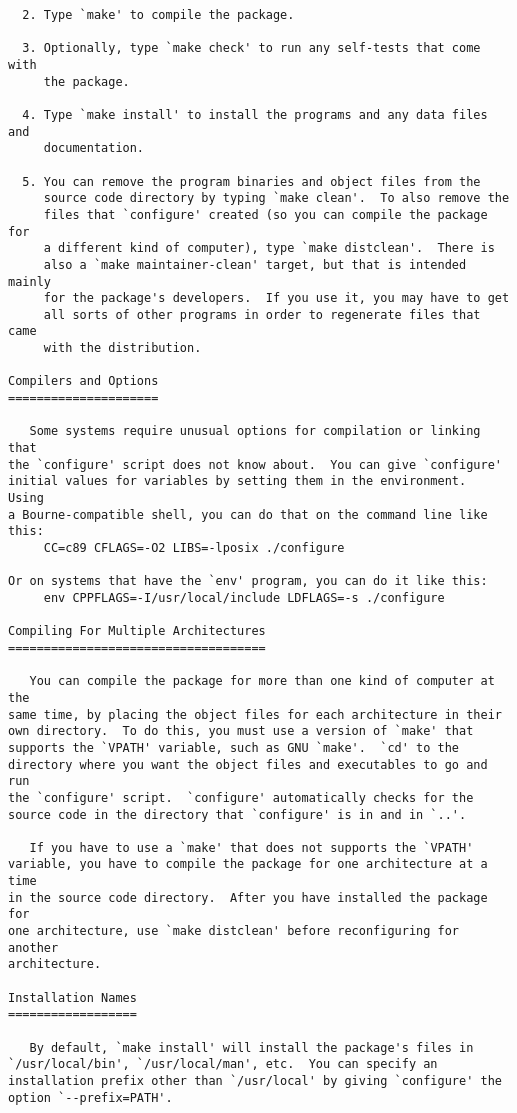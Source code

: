\begin{verbatim}
  2. Type `make' to compile the package.

  3. Optionally, type `make check' to run any self-tests that come with
     the package.

  4. Type `make install' to install the programs and any data files and
     documentation.

  5. You can remove the program binaries and object files from the
     source code directory by typing `make clean'.  To also remove the
     files that `configure' created (so you can compile the package for
     a different kind of computer), type `make distclean'.  There is
     also a `make maintainer-clean' target, but that is intended mainly
     for the package's developers.  If you use it, you may have to get
     all sorts of other programs in order to regenerate files that came
     with the distribution.

Compilers and Options
=====================

   Some systems require unusual options for compilation or linking that
the `configure' script does not know about.  You can give `configure'
initial values for variables by setting them in the environment.  Using
a Bourne-compatible shell, you can do that on the command line like
this:
     CC=c89 CFLAGS=-O2 LIBS=-lposix ./configure

Or on systems that have the `env' program, you can do it like this:
     env CPPFLAGS=-I/usr/local/include LDFLAGS=-s ./configure

Compiling For Multiple Architectures
====================================

   You can compile the package for more than one kind of computer at the
same time, by placing the object files for each architecture in their
own directory.  To do this, you must use a version of `make' that
supports the `VPATH' variable, such as GNU `make'.  `cd' to the
directory where you want the object files and executables to go and run
the `configure' script.  `configure' automatically checks for the
source code in the directory that `configure' is in and in `..'.

   If you have to use a `make' that does not supports the `VPATH'
variable, you have to compile the package for one architecture at a time
in the source code directory.  After you have installed the package for
one architecture, use `make distclean' before reconfiguring for another
architecture.

Installation Names
==================

   By default, `make install' will install the package's files in
`/usr/local/bin', `/usr/local/man', etc.  You can specify an
installation prefix other than `/usr/local' by giving `configure' the
option `--prefix=PATH'.


\end{verbatim}
